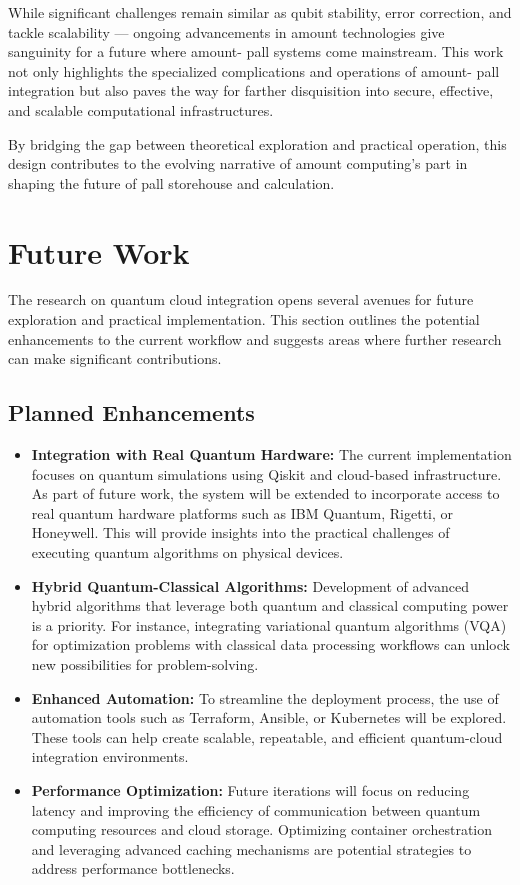 \documentclass[conference]{IEEEtran}
\begin{document}
While significant challenges remain similar as qubit stability, error correction, and tackle scalability — ongoing advancements in amount technologies give sanguinity for a future where amount- pall systems come mainstream. This work not only highlights the specialized complications and operations of amount- pall integration but also paves the way for farther disquisition into secure, effective, and scalable computational infrastructures.

By bridging the gap between theoretical exploration and practical operation, this design contributes to the evolving narrative of amount computing's part in shaping the future of pall storehouse and calculation.

\section{Future Work}

The research on quantum cloud integration opens several avenues for future exploration and practical implementation. This section outlines the potential enhancements to the current workflow and suggests areas where further research can make significant contributions.

\subsection{Planned Enhancements}

\begin{itemize}
    \item \textbf{Integration with Real Quantum Hardware:} The current implementation focuses on quantum simulations using Qiskit and cloud-based infrastructure. As part of future work, the system will be extended to incorporate access to real quantum hardware platforms such as IBM Quantum, Rigetti, or Honeywell. This will provide insights into the practical challenges of executing quantum algorithms on physical devices.

    \item \textbf{Hybrid Quantum-Classical Algorithms:} Development of advanced hybrid algorithms that leverage both quantum and classical computing power is a priority. For instance, integrating variational quantum algorithms (VQA) for optimization problems with classical data processing workflows can unlock new possibilities for problem-solving.

    \item \textbf{Enhanced Automation:} To streamline the deployment process, the use of automation tools such as Terraform, Ansible, or Kubernetes will be explored. These tools can help create scalable, repeatable, and efficient quantum-cloud integration environments.

    \item \textbf{Performance Optimization:} Future iterations will focus on reducing latency and improving the efficiency of communication between quantum computing resources and cloud storage. Optimizing container orchestration and leveraging advanced caching mechanisms are potential strategies to address performance bottlenecks.
\end{itemize}
\end{document}
